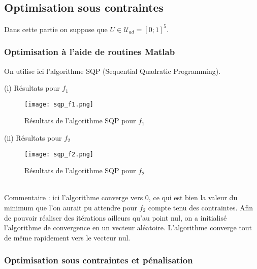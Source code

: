 \documentclass[a4paper]{article}
\begin{document}
\subsection{Optimisation sous contraintes}

Dans cette partie on suppose que $U \in \mathcal{U}_{ad} = [0;1]^5$.

\subsubsection{Optimisation à l'aide de routines Matlab}

On utilise ici l'algorithme SQP (Sequential Quadratic Programming).

\newpage
(i) Résultats pour $f_1$

\begin{figure}[h!]
\centering
\texttt{[image: sqp\_f1.png]}
\caption{Résultats de l'algorithme SQP pour $f_1$}
\label{fig:f1_results}
\end{figure}
\vspace{0.4cm}
(ii) Résultats pour $f_2$
\begin{figure}[h!]
\centering
\texttt{[image: sqp\_f2.png]}
\caption{Résultats de l'algorithme SQP pour $f_2$}
\label{fig:f2_results}
\end{figure}
\vspace{0.2cm}
\\ Commentaire : ici l'algorithme converge vers $0$, ce qui est bien la valeur du minimum que l'on aurait pu attendre pour $f_2$ compte tenu des contraintes. Afin de pouvoir réaliser des itérations ailleurs qu'au point nul, on a initialisé l'algorithme de convergence en un vecteur aléatoire. L'algorithme converge tout de même rapidement vers le vecteur nul.

\subsubsection{Optimisation sous contraintes et pénalisation}
\end{document}
